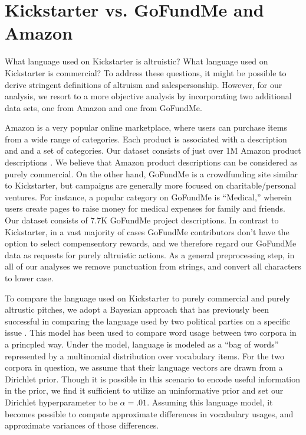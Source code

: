 \documentclass[letterpaper]{article}
\begin{document}
\section{Kickstarter vs. GoFundMe and Amazon}
What language used on Kickstarter is altruistic? What language used on Kickstarter is commercial? To address these questions, it might be possible to derive stringent definitions of altruism and salespersonship. However, for our analysis, we resort to a more objective analysis by incorporating two additional data sets, one from Amazon and one from GoFundMe.

Amazon is a very popular online marketplace, where users can purchase items from a wide range of categories. Each product is associated with a description and and a set of categories. Our dataset consists of just over 1M Amazon product descriptions \cite{mcauley2013hidden}. We believe that Amazon product descriptions can be considered as purely commercial. On the other hand, GoFundMe is a crowdfunding site similar to Kickstarter, but campaigns are generally more focused on charitable/personal ventures. For instance, a popular category on GoFundMe is ``Medical,'' wherein users create pages to raise money for medical expenses for family and friends. Our dataset consists of 7.7K GoFundMe project descriptions. In contrast to Kickstarter, in a vast majority of cases GoFundMe contributors don't have the option to select compensentory rewards, and we therefore regard our GoFundMe data as requests for purely altruistic actions. As a general preprocessing step, in all of our analyses we remove punctuation from strings, and convert all characters to lower case.

To compare the language used on Kickstarter to purely commercial and purely altrustic pitches, we adopt a Bayesian approach that has previously been successful in comparing the language used by two political parties on a specific issue \cite{monroe2008fightin}. This model has been used to compare word usage between two corpora in a princpled way. Under the model, language is modeled as a ``bag of words'' represented by a multinomial distribution over vocabulary items. For the two corpora in question, we assume that their language vectors are drawn from a Dirichlet prior. Though it is possible in this scenario to encode useful information in the prior, we find it sufficient to utilize an uninformative prior and set our Dirichlet hyperparameter to be $\alpha=.01$. Assuming this language model, it becomes possible to compute approximate differences in vocabulary usages, and approximate variances of those differences.
\end{document}
